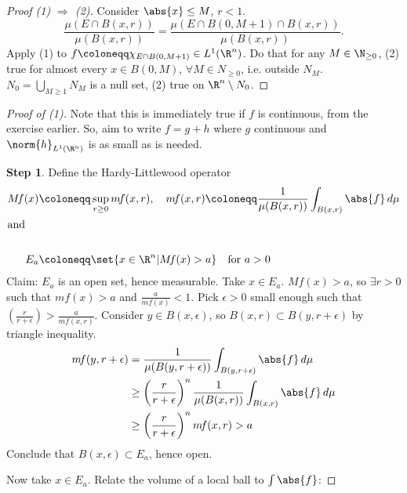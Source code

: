 \documentclass{article}
\begin{document}
\begin{proof}[Proof (1) $\Rightarrow$ (2)]
    Consider $\abs{x} \leq M$, $r < 1$.
    \begin{equation*}
        \frac{\mu(E \cap B(x, r))}{\mu(B(x, r))} = \frac{\mu(E \cap B(0, M+1) \cap B(x, r))}{\mu(B(x, r))}.
    \end{equation*}
    Apply (1) to $f \coloneqq \chi_{E \cap B(0, M+1)} \in L^1(\R^n)$.
    Do that for any $M \in \N_{\geq 0}$, (2) true for almost every $x \in B(0, M)$, $\forall M \in N_{\geq 0}$, i.e. outside $N_M$.
    $N_0 = \bigcup_{M \geq 1} N_M$ is a null set, (2) true on $\R^n \setminus N_0$.
\end{proof}
\begin{proof}[Proof of (1)]
    \newcommand{\mf}{m \! f}
    \newcommand{\Mf}{M \! f}
    Note that this is immediately true if $f$ is continuous, from the exercise earlier. So, aim to write $f = g+h$ where $g$ continuous and $\norm{h}_{L^1(\R^n)}$ is as small as is needed.

    \textbf{Step 1}. Define the Hardy-Littlewood operator
    \begin{align*}
        \Mf(x) &\coloneqq \sup_{r \geq 0}  \mf (x, r), \quad \mf(x, r) \coloneqq \frac{1}{\mu(B(x, r))} \int_{B(x,r)} \abs{f} \, d\mu\\
        \shortintertext{and} \\
        \quad E_a &\coloneqq \set{x \in \R^n | \Mf(x) > a} \quad \text{for } a > 0
    \end{align*}
    Claim: $E_a$ is an open set, hence measurable.
    Take $x \in E_a$. $\Mf(x) > a$, so $\exists r >0$ such that $\mf(x) > a$ and $\frac{a}{\mf(x)} < 1$.
    Pick $\epsilon > 0$ small enough such that $(\frac{r}{r+\epsilon}) > \frac{a}{\mf(x, r)}$. Consider $y \in B(x, \epsilon)$, so $B(x, r) \subset B(y, r + \epsilon)$ by triangle inequality.
    \begin{align*}
        \mf(y, r+\epsilon) &= \frac{1}{\mu(B(y, r+\epsilon))} \int_{B(y, r+\epsilon)} \abs{f} \, d\mu \\
                          &\geq \left(\frac{r}{r+\epsilon}\right)^n \frac{1}{\mu(B(x,r))} \int_{B(x, r)} \abs{f} \, d\mu \\
                          &\geq \left(\frac{r}{r+\epsilon}\right)^n \mf(x, r) > a
    \end{align*}
    Conclude that $B(x, \epsilon) \subset E_a$, hence open.

    Now take $x \in E_a$. Relate the volume of a local ball to $\int \abs{f}$:


\end{proof}
\end{document}
